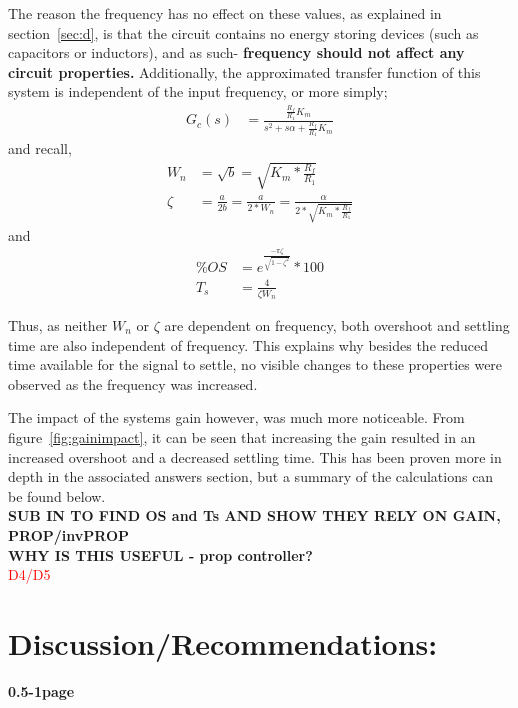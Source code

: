 \documentclass[11pt,a4paper]{article}
\begin{document}
The reason the frequency has no effect on these values, as explained in section~\ref{sec:d}, is that the circuit contains no energy storing devices (such as capacitors or inductors), and as such- \textbf{frequency should not affect any circuit properties.} Additionally, the approximated transfer function of this system is independent of the input frequency, or more simply;
\begin{align*}
G_c(s) &= \frac{\frac{R_f}{R_1}K_m} {s^2 + s\alpha + \frac{R_f}{R_1}K_m}
\end{align*}
and recall, 
\begin{align*}
W_n &= \sqrt{b} = \sqrt{K_m * \frac{R_f}{R_1}} \\
\zeta &= \frac{a}{2b} = \frac{a}{2*W_n} = \frac{\alpha}{2*\sqrt{K_m * \frac{R_f}{R_1}}}
\end{align*}
and
\begin{align*}
\%OS &= e^{\frac{-\pi \zeta}{\sqrt{1-\zeta^2}}} * 100 \\
T_s &= \frac{4}{\zeta W_n}
\end{align*}

Thus, as neither $W_n$ or $\zeta$ are dependent on frequency, both overshoot and settling time are also independent of frequency. 
This explains why besides the reduced time available for the signal to settle, no visible changes to these properties were observed as the frequency was increased. 

The impact of the systems gain however, was much more noticeable. From figure~\ref{fig:gainimpact}, it can be seen that increasing the gain resulted in an increased overshoot and a decreased settling time. This has been proven more in depth in the associated answers section, but a summary of the calculations can be found below.  \\
\textbf{SUB IN TO FIND OS and Ts AND SHOW THEY RELY ON GAIN, PROP/invPROP}\\
\textbf{WHY IS THIS USEFUL - prop controller?}\\
\textcolor{red}{D4/D5}



\pagebreak
\section{Discussion/Recommendations:}
\textbf{0.5-1page}\\








\pagebreak
\end{document}
